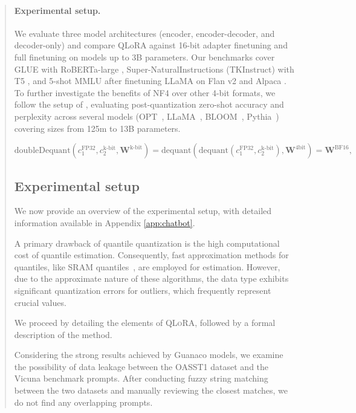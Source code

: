 \begin{quote}
\paragraph{Experimental setup.} We evaluate three model architectures (encoder, encoder-decoder, and decoder-only) and compare QLoRA against 16-bit adapter finetuning and full finetuning on models up to 3B parameters. Our benchmarks cover GLUE \citep{wang2018glue} with RoBERTa-large \citep{liu2019roberta}, Super-NaturalInstructions (TKInstruct) \citep{wang2022super} with T5 \citep{t5}, and 5-shot MMLU \citep{hendrycksmeasuring} after finetuning LLaMA on Flan v2 \citep{longpre2023flan} and Alpaca \citep{alpaca}. To further investigate the benefits of NF4 over other 4-bit formats, we follow the setup of \citet{dettmers2022case}, evaluating post-quantization zero-shot accuracy and perplexity across several models (OPT~\citep{zhang2022opt}, LLaMA~\citep{touvron2023llama}, BLOOM~\citep{scao2022bloom}, Pythia~\citep{biderman2023pythia}) covering sizes from 125m to 13B parameters.

\begin{equation}
    \text{doubleDequant}(c_1^{\text{FP32}}, c_2^{\text{k-bit}}, \mathbf{W}^{\text{k-bit}}) = \text{dequant}(\text{dequant}(c_1^{\text{FP32}}, c_2^{\text{k-bit}}), \mathbf{W}^{\text{4bit}}) = \mathbf{W}^{\text{BF16}},
\end{equation}

\subsection{Experimental setup} We now provide an overview of the experimental setup, with detailed information available in Appendix \ref{app:chatbot}.

A primary drawback of quantile quantization is the high computational cost of quantile estimation. Consequently, fast approximation methods for quantiles, like SRAM quantiles~\citep{dettmers2022optimizers}, are employed for estimation. However, due to the approximate nature of these algorithms, the data type exhibits significant quantization errors for outliers, which frequently represent crucial values.

We proceed by detailing the elements of \textsc{QLoRA}, followed by a formal description of the method.

Considering the strong results achieved by {Guanaco} models, we examine the possibility of data leakage between the OASST1 dataset and the Vicuna benchmark prompts. After conducting fuzzy string matching between the two datasets and manually reviewing the closest matches, we do not find any overlapping prompts.


\end{quote}
